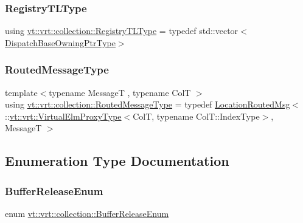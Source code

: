 \subsubsection{\texorpdfstring{Registry\+T\+L\+Type}{RegistryTLType}}
{\footnotesize\ttfamily using \hyperlink{namespacevt_1_1vrt_1_1collection_aecdad7ed4df3be1bab2a6bb9c5945964}{vt\+::vrt\+::collection\+::\+Registry\+T\+L\+Type} = typedef std\+::vector$<$\hyperlink{namespacevt_1_1vrt_1_1collection_a124f83d203352b6bccc4f12ca489b68b}{Dispatch\+Base\+Owning\+Ptr\+Type}$>$}

\mbox{\label{namespacevt_1_1vrt_1_1collection_a1bbc628be0955797f2d45227ee526346}} 
\subsubsection{\texorpdfstring{Routed\+Message\+Type}{RoutedMessageType}}
{\footnotesize\ttfamily template$<$typename MessageT , typename ColT $>$ \\
using \hyperlink{namespacevt_1_1vrt_1_1collection_a1bbc628be0955797f2d45227ee526346}{vt\+::vrt\+::collection\+::\+Routed\+Message\+Type} = typedef \hyperlink{namespacevt_a0cb65f2151629893480ef391def4e733}{Location\+Routed\+Msg}$<$ \+::\hyperlink{namespacevt_1_1vrt_a620a5c8c59d13e513f690c74b4af516f}{vt\+::vrt\+::\+Virtual\+Elm\+Proxy\+Type}$<$ColT, typename Col\+T\+::\+Index\+Type$>$, MessageT $>$}



\subsection{Enumeration Type Documentation}
\mbox{\label{namespacevt_1_1vrt_1_1collection_a2545006e681bacc1f00be9d5d6bdc8fa}} 
\subsubsection{\texorpdfstring{Buffer\+Release\+Enum}{BufferReleaseEnum}}
{\footnotesize\ttfamily enum \hyperlink{namespacevt_1_1vrt_1_1collection_a2545006e681bacc1f00be9d5d6bdc8fa}{vt\+::vrt\+::collection\+::\+Buffer\+Release\+Enum}}



